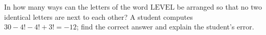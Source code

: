 In how many ways can the letters of the word $\mathrm{LEVEL}$ be arranged so that no two identical letters are next to each other? A student computes $30-4!-4!+3!=-12$; find the correct answer and explain the student's error.
